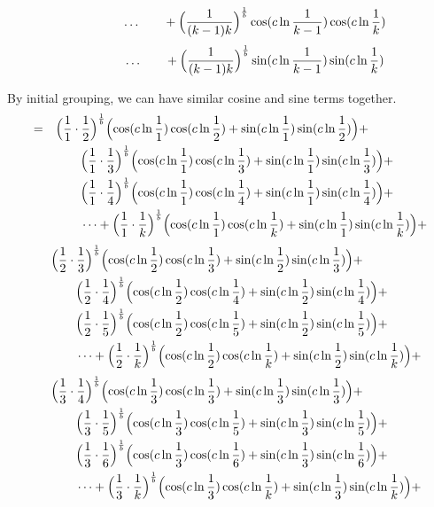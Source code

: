 \documentclass{amsart}
\begin{document}
	\[ \qquad\qquad \dots \qquad + \Bigl( \frac{1}{(k-1)k} \Bigr)^\frac1b \cos(c \ln \frac{1}{k-1}) \cos(c \ln \frac{1}{k}) \]
	\[ \qquad\qquad \dots \qquad + \Bigl( \frac{1}{(k-1)k} \Bigr)^\frac1b \sin(c \ln \frac{1}{k-1}) \sin(c \ln \frac{1}{k}) \]
	
	\[\]
	By initial grouping, we can have similar cosine and sine terms together.
	\[
	\begin{aligned}
		= \quad & \Bigl( \frac{1}{1} \cdot \frac{1}{2} \Bigr)^\frac1b \Bigl( \cos(c \ln \frac{1}{1}) \cos(c \ln \frac{1}{2}) + \sin(c \ln \frac{1}{1}) \sin(c \ln \frac{1}{2}) \Bigr) + \\
		& \qquad \Bigl( \frac{1}{1} \cdot \frac{1}{3} \Bigr)^\frac1b \Bigl( \cos(c \ln \frac{1}{1}) \cos(c \ln \frac{1}{3}) + \sin(c \ln \frac{1}{1}) \sin(c \ln \frac{1}{3}) \Bigr) + \\
		& \qquad \Bigl( \frac{1}{1} \cdot \frac{1}{4} \Bigr)^\frac1b \Bigl( \cos(c \ln \frac{1}{1}) \cos(c \ln \frac{1}{4}) + \sin(c \ln \frac{1}{1}) \sin(c \ln \frac{1}{4}) \Bigr) + \\
		& \qquad \dots  + \Bigl( \frac{1}{1} \cdot \frac{1}{k} \Bigr)^\frac1b \Bigl( \cos(c \ln \frac{1}{1}) \cos(c \ln \frac{1}{k}) + \sin(c \ln \frac{1}{1}) \sin(c \ln \frac{1}{k}) \Bigr) + 
	\end{aligned}
	\]
	\[
	\begin{aligned}
		\quad & \Bigl( \frac{1}{2} \cdot \frac{1}{3} \Bigr)^\frac1b \Bigl( \cos(c \ln \frac{1}{2}) \cos(c \ln \frac{1}{3}) + \sin(c \ln \frac{1}{2}) \sin(c \ln \frac{1}{3}) \Bigr) + \\
		& \qquad \Bigl( \frac{1}{2} \cdot \frac{1}{4} \Bigr)^\frac1b \Bigl( \cos(c \ln \frac{1}{2}) \cos(c \ln \frac{1}{4}) + \sin(c \ln \frac{1}{2}) \sin(c \ln \frac{1}{4}) \Bigr) + \\
		& \qquad \Bigl( \frac{1}{2} \cdot \frac{1}{5} \Bigr)^\frac1b \Bigl( \cos(c \ln \frac{1}{2}) \cos(c \ln \frac{1}{5}) + \sin(c \ln \frac{1}{2}) \sin(c \ln \frac{1}{5}) \Bigr) + \\
		& \qquad \dots  + \Bigl( \frac{1}{2} \cdot \frac{1}{k} \Bigr)^\frac1b \Bigl( \cos(c \ln \frac{1}{2}) \cos(c \ln \frac{1}{k}) + \sin(c \ln \frac{1}{2}) \sin(c \ln \frac{1}{k}) \Bigr) + 
	\end{aligned}
	\]
	\[
	\begin{aligned}
		\quad & \Bigl( \frac{1}{3} \cdot \frac{1}{4} \Bigr)^\frac1b \Bigl( \cos(c \ln \frac{1}{3}) \cos(c \ln \frac{1}{3}) + \sin(c \ln \frac{1}{3}) \sin(c \ln \frac{1}{3}) \Bigr) + \\
		& \qquad \Bigl( \frac{1}{3} \cdot \frac{1}{5} \Bigr)^\frac1b \Bigl( \cos(c \ln \frac{1}{3}) \cos(c \ln \frac{1}{5}) + \sin(c \ln \frac{1}{3}) \sin(c \ln \frac{1}{5}) \Bigr) + \\
		& \qquad \Bigl( \frac{1}{3} \cdot \frac{1}{6} \Bigr)^\frac1b \Bigl( \cos(c \ln \frac{1}{3}) \cos(c \ln \frac{1}{6}) + \sin(c \ln \frac{1}{3}) \sin(c \ln \frac{1}{6}) \Bigr) + \\
		& \qquad \dots  + \Bigl( \frac{1}{3} \cdot \frac{1}{k} \Bigr)^\frac1b \Bigl( \cos(c \ln \frac{1}{3}) \cos(c \ln \frac{1}{k}) + \sin(c \ln \frac{1}{3}) \sin(c \ln \frac{1}{k}) \Bigr) + 
	\end{aligned}
	\]
\end{document}
